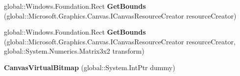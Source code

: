 \begin{DoxyCompactItemize}
global\+::\+Windows.\+Foundation.\+Rect {\bfseries Get\+Bounds} (global\+::\+Microsoft.\+Graphics.\+Canvas.\+I\+Canvas\+Resource\+Creator resource\+Creator)
\item 
\mbox{\label{class_microsoft_1_1_graphics_1_1_canvas_1_1_canvas_virtual_bitmap_aaa158707cfd84b8d995986896e041c86}} 
global\+::\+Windows.\+Foundation.\+Rect {\bfseries Get\+Bounds} (global\+::\+Microsoft.\+Graphics.\+Canvas.\+I\+Canvas\+Resource\+Creator resource\+Creator, global\+::\+System.\+Numerics.\+Matrix3x2 transform)
\item 
\mbox{\label{class_microsoft_1_1_graphics_1_1_canvas_1_1_canvas_virtual_bitmap_aeaea1d4461bcea11a0a08b9543be5651}} 
{\bfseries Canvas\+Virtual\+Bitmap} (global\+::\+System.\+Int\+Ptr dummy)
\end{DoxyCompactItemize}
